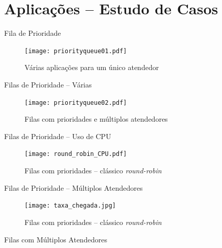 \section{Aplicações -- Estudo de Casos}




\begin{frame}[c]{Fila de Prioridade} 

		   	\begin{figure}[!htpb]
				\centering
 \texttt{[image: priorityqueue01.pdf]}
\caption{Várias aplicações para um único atendedor}
			\end{figure} 
\end{frame}



\begin{frame}[c]{Filas de Prioridade -- Várias} 

		   	\begin{figure}[!htpb]
				\centering
 \texttt{[image: priorityqueue02.pdf]}
\caption{Filas com prioridades e múltiplos atendedores}
			\end{figure} 
\end{frame}



\begin{frame}[c]{Filas de Prioridade -- Uso de CPU} 

		   	\begin{figure}[!htpb]
				\centering
 \texttt{[image: round\_robin\_CPU.pdf]}
\caption{Filas com prioridades -- clássico \textit{round-robin}}
			\end{figure} 
\end{frame}




\begin{frame}[c]{Filas de Prioridade -- Múltiplos Atendedores} 

		   	\begin{figure}[!htpb]
				\centering
 \texttt{[image: taxa\_chegada.jpg]}
\caption{Filas com prioridades -- clássico \textit{round-robin}}
			\end{figure} 
\end{frame}


\begin{frame}[c]{Filas com Múltiplos Atendedores} 

		   	\begin{figure}[!htpb]
				\centering

			\end{figure} 
\end{frame}


